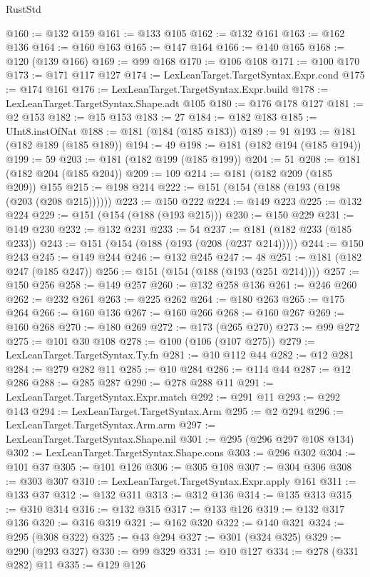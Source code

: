 \begin{lexlean}{RustStd}
\begin{coremodule}
@160 := @132 @159
@161 := @133 @105
@162 := @132 @161
@163 := @162 @136
@164 := @160 @163
@165 := @147 @164
@166 := @140 @165
@168 := @120 (@139 @166)
@169 := @99 @168
@170 := @106 @108
@171 := @100 @170
@173 := @171 @117 @127
@174 := LexLeanTarget.TargetSyntax.Expr.cond
@175 := @174 @161
@176 := LexLeanTarget.TargetSyntax.Expr.build
@178 := LexLeanTarget.TargetSyntax.Shape.adt @105
@180 := @176 @178 @127
@181 := @2 @153
@182 := @15 @153
@183 := 27
@184 := @182 @183
@185 := UInt8.instOfNat
@188 := @181 (@184 (@185 @183))
@189 := 91
@193 := @181 (@182 @189 (@185 @189))
@194 := 49
@198 := @181 (@182 @194 (@185 @194))
@199 := 59
@203 := @181 (@182 @199 (@185 @199))
@204 := 51
@208 := @181 (@182 @204 (@185 @204))
@209 := 109
@214 := @181 (@182 @209 (@185 @209)) @155
@215 := @198 @214
@222 := @151 (@154 (@188 (@193 (@198 (@203 (@208 @215))))))
@223 := @150 @222
@224 := @149 @223
@225 := @132 @224
@229 := @151 (@154 (@188 (@193 @215)))
@230 := @150 @229
@231 := @149 @230
@232 := @132 @231
@233 := 54
@237 := @181 (@182 @233 (@185 @233))
@243 := @151 (@154 (@188 (@193 (@208 (@237 @214)))))
@244 := @150 @243
@245 := @149 @244
@246 := @132 @245
@247 := 48
@251 := @181 (@182 @247 (@185 @247))
@256 := @151 (@154 (@188 (@193 (@251 @214))))
@257 := @150 @256
@258 := @149 @257
@260 := @132 @258 @136
@261 := @246 @260
@262 := @232 @261
@263 := @225 @262
@264 := @180 @263
@265 := @175 @264
@266 := @160 @136
@267 := @160 @266
@268 := @160 @267
@269 := @160 @268
@270 := @180 @269
@272 := @173 (@265 @270)
@273 := @99 @272
@275 := @101 @30 @108
@278 := @100 (@106 (@107 @275))
@279 := LexLeanTarget.TargetSyntax.Ty.fn
@281 := @10 @112 @44
@282 := @12 @281
@284 := @279 @282 @11
@285 := @10 @284
@286 := @114 @44
@287 := @12 @286
@288 := @285 @287
@290 := @278 @288 @11
@291 := LexLeanTarget.TargetSyntax.Expr.match
@292 := @291 @11
@293 := @292 @143
@294 := LexLeanTarget.TargetSyntax.Arm
@295 := @2 @294
@296 := LexLeanTarget.TargetSyntax.Arm.arm
@297 := LexLeanTarget.TargetSyntax.Shape.nil
@301 := @295 (@296 @297 @108 @134)
@302 := LexLeanTarget.TargetSyntax.Shape.cons
@303 := @296 @302
@304 := @101 @37
@305 := @101 @126
@306 := @305 @108
@307 := @304 @306
@308 := @303 @307
@310 := LexLeanTarget.TargetSyntax.Expr.apply @161
@311 := @133 @37
@312 := @132 @311
@313 := @312 @136
@314 := @135 @313
@315 := @310 @314
@316 := @132 @315
@317 := @133 @126
@319 := @132 @317 @136
@320 := @316 @319
@321 := @162 @320
@322 := @140 @321
@324 := @295 (@308 @322)
@325 := @43 @294
@327 := @301 (@324 @325)
@329 := @290 (@293 @327)
@330 := @99 @329
@331 := @10 @127
@334 := @278 (@331 @282) @11
@335 := @129 @126

\end{coremodule}
\end{lexlean}
